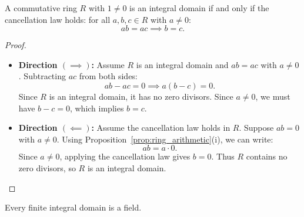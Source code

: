 \begin{proposition}
\label{prop:cancellation_domain}
A commutative ring $R$ with $1 \ne 0$ is an integral domain if and only if the cancellation law holds: for all $a, b, c \in R$ with $a \ne 0$:
\begin{equation}
ab = ac \implies b = c.
\end{equation}
\end{proposition}

\begin{proof}
\begin{itemize}[leftmargin=1.5em, itemsep=6pt]
    \item \textbf{Direction $(\implies)$:} Assume $R$ is an integral domain and $ab = ac$ with $a \ne 0$.
    Subtracting $ac$ from both sides:
    \begin{equation*}
    ab - ac = 0 \implies a(b - c) = 0.
    \end{equation*}
    Since $R$ is an integral domain, it has no zero divisors.
    Since $a \ne 0$, we must have $b - c = 0$, which implies $b = c$.
    
    \item \textbf{Direction $(\impliedby)$:} Assume the cancellation law holds in $R$.
    Suppose $ab = 0$ with $a \ne 0$.
    Using Proposition~\ref{prop:ring_arithmetic}(i), we can write:
    \begin{equation*}
    ab = a \cdot 0.
    \end{equation*}
    Since $a \ne 0$, applying the cancellation law gives $b = 0$.
    Thus $R$ contains no zero divisors, so $R$ is an integral domain.
\end{itemize}
\end{proof}

\begin{theorem}
\label{thm:finite_domains}
Every finite integral domain is a field.
\end{theorem}


